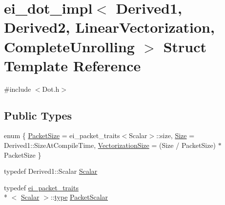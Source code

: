 \hypertarget{structei__dot__impl_3_01_derived1_00_01_derived2_00_01_linear_vectorization_00_01_complete_unrolling_01_4}{\section{ei\-\_\-dot\-\_\-impl$<$ Derived1, Derived2, Linear\-Vectorization, Complete\-Unrolling $>$ Struct Template Reference}
\label{structei__dot__impl_3_01_derived1_00_01_derived2_00_01_linear_vectorization_00_01_complete_unrolling_01_4}
}


{\ttfamily \#include $<$Dot.\-h$>$}

\subsection*{Public Types}
\begin{DoxyCompactItemize}
\item 
enum \{ \hyperlink{structei__dot__impl_3_01_derived1_00_01_derived2_00_01_linear_vectorization_00_01_complete_unrolling_01_4_aab4dcba2b572a3b0166fdae5fac025dca3a9ede278d9a584c52866b106cae9f26}{Packet\-Size} = ei\-\_\-packet\-\_\-traits$<$Scalar$>$\-:\-:size, 
\hyperlink{structei__dot__impl_3_01_derived1_00_01_derived2_00_01_linear_vectorization_00_01_complete_unrolling_01_4_aab4dcba2b572a3b0166fdae5fac025dca3389fe194b082b6c034d492d2dfa98fe}{Size} = Derived1\-:\-:Size\-At\-Compile\-Time, 
\hyperlink{structei__dot__impl_3_01_derived1_00_01_derived2_00_01_linear_vectorization_00_01_complete_unrolling_01_4_aab4dcba2b572a3b0166fdae5fac025dca40d2ec40b9d18df38f96262c683f9c77}{Vectorization\-Size} = (Size / Packet\-Size) $\ast$ Packet\-Size
 \}
\item 
typedef Derived1\-::\-Scalar \hyperlink{structei__dot__impl_3_01_derived1_00_01_derived2_00_01_linear_vectorization_00_01_complete_unrolling_01_4_a16334f659e0368c0d33734a5428e9712}{Scalar}
\item 
typedef \hyperlink{structei__packet__traits}{ei\-\_\-packet\-\_\-traits}\\*
$<$ \hyperlink{structei__dot__impl_3_01_derived1_00_01_derived2_00_01_linear_vectorization_00_01_complete_unrolling_01_4_a16334f659e0368c0d33734a5428e9712}{Scalar} $>$\-::\hyperlink{glext_8h_a7d05960f4f1c1b11f3177dc963a45d86}{type} \hyperlink{structei__dot__impl_3_01_derived1_00_01_derived2_00_01_linear_vectorization_00_01_complete_unrolling_01_4_a796e5efff433441982f1b9604020d305}{Packet\-Scalar}
\end{DoxyCompactItemize}
